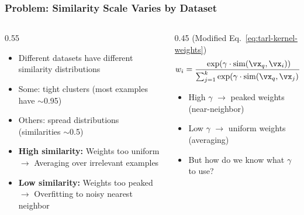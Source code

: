 \documentclass[
	10pt, %
	aspectratio=169, %
]{beamer}
\begin{document}
\begin{frame}
	\frametitle{Problem: Similarity Scale Varies by Dataset}
	\begin{columns}[c]
		\begin{column}{0.55\textwidth}
			\begin{itemize}
				\item Different datasets have different similarity distributions
				\item Some: tight clusters (most examples have $\sim$0.95)
				\item Others: spread distributions (similarities $\sim$0.5)
			\end{itemize}

			\vspace{0.5em}
			\begin{itemize}
				\item \textbf{High similarity:} Weights too uniform\\
				      $\rightarrow$ Averaging over irrelevant examples
				\item \textbf{Low similarity:} Weights too peaked\\
				      $\rightarrow$ Overfitting to noisy nearest neighbor
			\end{itemize}
		\end{column}
		\begin{column}{0.45\textwidth}
			 (Modified Eq.~\ref{eq:tarl-kernel-weights})
			\[
				w_i = \frac{\exp(\gamma \cdot \text{sim}(\vx_q, \vx_i))}{\sum_{j=1}^k \exp(\gamma \cdot \text{sim}(\vx_q, \vx_j))}
			\]
			\vspace{0.5em}
			\begin{itemize}
				\item High $\gamma$ $\rightarrow$ peaked weights (near-neighbor)
				\item Low $\gamma$ $\rightarrow$ uniform weights (averaging)
				\item But how do we know what $\gamma$ to use?
			\end{itemize}
		\end{column}
	\end{columns}
\end{frame}
\end{document}
